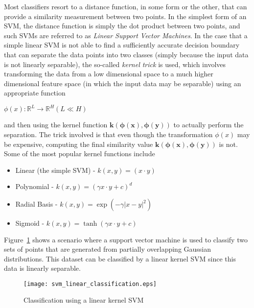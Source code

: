 Most classifiers resort to a distance function, in some form or the other, that can provide a similarity measurement between two points. In the simplest form of an SVM, the distance function is simply the dot product between two points, and such SVMs are referred to as \emph{Linear Support Vector Machines}. In the case that a simple linear SVM is not able to find a sufficiently accurate decision boundary that can separate the data points into two classes (simply because the input data is not linearly separable), the so-called \emph{kernel trick} is used, which involves transforming the data from a low dimensional space to a much higher dimensional feature space (in which the input data may be separable) using an appropriate function

\begin{center}
    $\phi(x): \mathbb{R}^{L} \rightarrow \mathbb{R}^H (L \ll H)$
\end{center}

and then using the kernel function $\mathbf{k(\phi(x), \phi(y))}$ to actually perform the separation. The trick involved is that even though the transformation $\phi(x)$ may be expensive, computing the final similarity value $\mathbf{k(\phi(x), \phi(y))}$ is not.\\

Some of the most popular kernel functions include
\begin{itemize}
    \item{Linear (the simple SVM) - $k(x, y) = (x \cdot y)$ }
    \item{Polynomial - $k(x, y) = (\gamma x \cdot y + c)^{d}$}
    \item{Radial Basis - $k(x, y) = \exp(-\gamma {| x - y |}^{2})$}
    \item{Sigmoid - $k(x, y) = \tanh(\gamma x \cdot y + c)$}
\end{itemize}

Figure~\ref{fig:svm_linear_classify} shows a scenario where a support vector machine is used to classify two sets of points that are generated from partially overlapping Gaussian distributions. This dataset can be classified by a linear kernel SVM since this data is linearly separable.\\

\begin{figure}[t!]
    \centering
    \texttt{[image: svm\_linear\_classification.eps]}
    \caption{Classification using a linear kernel SVM}
    \label{fig:svm_linear_classify}
\end{figure}

